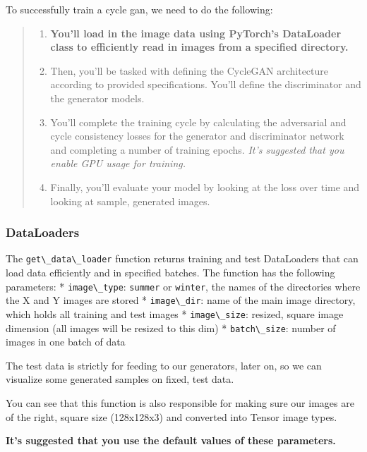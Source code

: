 To successfully train a cycle gan, we need to do the following:

\begin{quote}
\begin{enumerate}
\item \textbf{You'll load in the image data using PyTorch's DataLoader class to efficiently read in images from a specified directory.}
\item Then, you'll be tasked with defining the CycleGAN architecture according to provided specifications. You'll define the discriminator and the generator models.
\item You'll complete the training cycle by calculating the adversarial and cycle consistency losses for the generator and discriminator network and completing a number of training epochs. \emph{It's suggested that you enable GPU usage for training.}
\item Finally, you'll evaluate your model by looking at the loss over time and looking at sample, generated images.
\end{enumerate}
\end{quote}
\subsubsection{DataLoaders}
The \lstinline{get\_data\_loader} function returns
training and test DataLoaders that can load data efficiently and in
specified batches. The function has the following parameters: *
\lstinline{image\_type}: \lstinline{summer}
or \lstinline{winter}, the names of the directories where
the X and Y images are stored * \lstinline{image\_dir}:
name of the main image directory, which holds all training and test
images * \lstinline{image\_size}: resized, square image
dimension (all images will be resized to this dim) *
\lstinline{batch\_size}: number of images in one batch of
data \newline

The test data is strictly for feeding to our generators, later on, so we
can visualize some generated samples on fixed, test data. \newline

You can see that this function is also responsible for making sure our
images are of the right, square size (128x128x3) and converted into
Tensor image types.\newline

\textbf{It's suggested that you use the default values of these
parameters.} \newline

